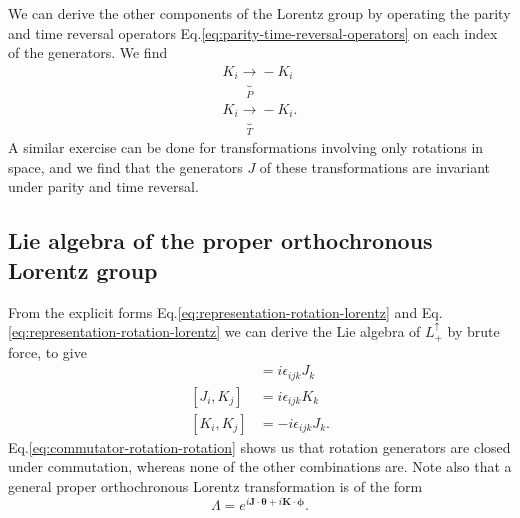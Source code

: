 \documentclass[11pt]{article}
\numberwithin{equation}{section}
\begin{document}
We can derive the other components of the Lorentz group by operating the parity and time reversal operators Eq.\eqref{eq:parity-time-reversal-operators} on each index of the generators. We find
\begin{align}
K_i \underbrace{\rightarrow}_P - K_i \label{eq:tfm-boost-parity} \\
K_i \underbrace{\rightarrow}_T - K_i.
\end{align}
A similar exercise can be done for transformations involving only rotations in space, and we find that the generators $J$ of these transformations are invariant under parity and time reversal.

\subsection{Lie algebra of the proper orthochronous Lorentz group}
From the explicit forms Eq.\eqref{eq:representation-rotation-lorentz} and Eq.\eqref{eq:representation-rotation-lorentz} we can derive the Lie algebra of $L_+^\uparrow$ by brute force, to give
\begin{align}
[J_i, J_j] &= i \epsilon_{ijk} J_k \label{eq:commutator-rotation-rotation}\\
[J_i, K_j] &= i \epsilon_{ijk} K_k \label{eq:commutator-rotation-boost}\\
[K_i, K_j] &= -i \epsilon_{ijk} J_k.\label{eq:commutator-boost-boost}
\end{align}
Eq.\eqref{eq:commutator-rotation-rotation} shows us that rotation generators are closed under commutation, whereas none of the other combinations are. Note also that a general proper orthochronous Lorentz transformation is of the form
\begin{equation}
\Lambda = e^{i \boldsymbol{J}\cdot \boldsymbol{\theta} + i \boldsymbol{K}\cdot \boldsymbol{\phi}}.
\end{equation}
\end{document}
